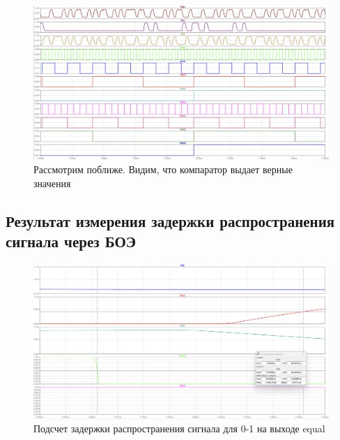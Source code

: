 \documentclass[12pt,onecolumn]{article}
\begin{document}
\begin{figure}[H]
    \centering
    \includegraphics[width=\textwidth]{image/full-comparator-test-zoom.png}
    \caption{Рассмотрим поближе. Видим, что компаратор выдает верные значения}
\end{figure}
\subsection{Результат измерения задержки распространения сигнала через БОЭ}
\begin{figure}[H]
    \centering
    \includegraphics[width=\textwidth]{image/full-comparator-test-eq-01.png}
    \caption{Подсчет задержки распространения сигнала для 0-1 на выходе equal}
\end{figure}
\end{document}
